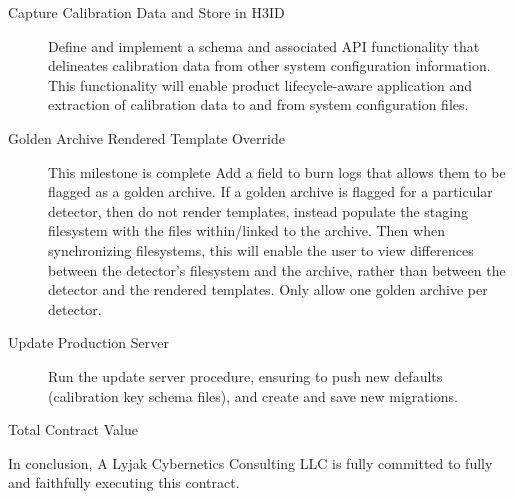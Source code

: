 \documentclass[8pt, letterpaper]{awesome-cv} %
\begin{document}
\begin{cvletter}
\begin{description}
    \item[Capture Calibration Data and Store in H3ID] Define and implement a schema and associated
      API functionality that delineates calibration data from other system configuration
      information. This functionality will enable product lifecycle-aware application and extraction
      of calibration data to and from system configuration files. 

    \item[Golden Archive Rendered Template Override] This milestone is complete Add a field to burn
      logs that allows them to be flagged as a golden archive. If a golden archive is flagged for a
      particular detector, then do not render templates, instead populate the staging filesystem
      with the files within/linked to the archive. Then when synchronizing filesystems, this will
      enable the user to view differences between the detector's filesystem and the archive, rather
      than between the detector and the rendered templates. Only allow one golden archive per
      detector. 


    \item[Update Production Server] Run the update server procedure, ensuring to push new defaults
      (calibration key schema files), and create and save new migrations. 

    \item[Total Contract Value] 

  \end{description}

  In conclusion, A Lyjak Cybernetics Consulting LLC is fully committed to fully and faithfully
  executing this contract. \\

\end{cvletter}
 \\\\\\\\\\
 \\



\end{document}
